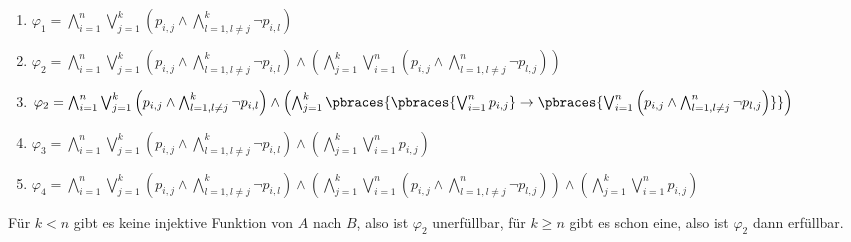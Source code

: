 \begin{solution}
\phantom{}
\begin{enumerate}[label = \arabic*.]
	\item $\varphi_1 = \bigwedge_{i=1}^n \bigvee_{j=1}^k\left(p_{i,j} \land \bigwedge_{l=1,l\neq j}^{k}\neg p_{i,l}\right)$
	\item $\varphi_2 = \bigwedge_{i=1}^n \bigvee_{j=1}^k\left(p_{i,j} \land \bigwedge_{l=1,l\neq j}^{k}\neg p_{i,l}\right)
  \land  \left(\bigwedge_{j=1}^k \bigvee_{i=1}^n\left(p_{i,j} \land \bigwedge_{l=1,l\neq j}^{n}\neg p_{l,j}\right)\right)$
    \item $\varphi_2 = \bigwedge_{i=1}^n \bigvee_{j=1}^k\left(p_{i,j} \land \bigwedge_{l=1,l\neq j}^{k}\neg p_{i,l}\right)
    \land  \left(\bigwedge_{j=1}^k \pbraces{\pbraces{\bigvee_{i=1}^n p_{i,j}} \rightarrow \pbraces{\bigvee_{i=1}^n\left(p_{i,j} \land \bigwedge_{l=1,l\neq j}^{n}\neg p_{l,j}\right)}}\right)$
	\item $\varphi_3 = \bigwedge_{i=1}^n \bigvee_{j=1}^k\left(p_{i,j} \land \bigwedge_{l=1,l\neq j}^{k}\neg p_{i,l}\right) \land
  \left(\bigwedge_{j=1}^k \bigvee_{i=1}^np_{i,j}\right)$
	\item $\varphi_4 = \bigwedge_{i=1}^n \bigvee_{j=1}^k\left(p_{i,j} \land \bigwedge_{l=1,l\neq j}^{k}\neg p_{i,l}\right)
  \land  \left(\bigwedge_{j=1}^k \bigvee_{i=1}^n\left(p_{i,j} \land \bigwedge_{l=1,l\neq j}^{n}\neg p_{l,j}\right)\right) \land
  \left(\bigwedge_{j=1}^k \bigvee_{i=1}^np_{i,j}\right)$
\end{enumerate}
Für $k < n$ gibt es keine injektive Funktion von $A$ nach $B$, also ist $\varphi_2$ unerfüllbar, für $k \geq n$ gibt es schon eine, also ist $\varphi_2$ dann erfüllbar.

\end{solution}


